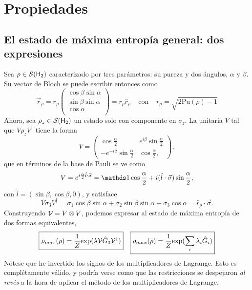 \section{Propiedades}


\subsection{El estado de máxima entropía general: dos expresiones}
Sea $\rho\in\mathcal{S}({\sf H}_{2})$ caracterizado por tres parámetros: su pureza y dos ángulos, $\alpha$ y $\beta$. Su vector de Bloch se puede escribir entonces como
\begin{equation}
  \vec{r}_{\rho}=r_{\rho}\begin{pmatrix}
    \cos{\beta}\sin{\alpha}\\
    \sin{\beta}\sin{\alpha}\\
    \cos{\alpha}\\
  \end{pmatrix}=r_{\rho}\hat{r}_{\rho} \; \; \; \; \text{con} \; \; \; \; r_{\rho}=\sqrt{2\text{Pu}(\rho)-1}
\end{equation}
Ahora, sea $\rho_{z}\in\mathcal{S}({\sf H}_{2})$ un estado solo con componente en $\sigma_{z}$. La unitaria $V$ tal que $V\rho_{z} V^{\dag}$ tiene la forma
\begin{equation}
  V=
  \begin{pmatrix}
      \cos{\frac{\alpha}{2}} & e^{i\beta}\sin{\frac{\alpha}{2}}\\
      -e^{-i\beta}\sin{\frac{\alpha}{2}}& \cos{\frac{\alpha}{2}},
  \end{pmatrix},
\end{equation}
que en términos de la base de Pauli se ve como
\begin{equation}
  V=e^{i\frac{\alpha}{2} \hat{l}\cdot \vec{\sigma}}=\Id \cos{\frac{\alpha}{2}}+i(\hat{l}\cdot \vec{\sigma})\sin{\frac{\alpha}{2}},
\end{equation}
con $\hat{l}=(\sin{\beta},\cos{\beta},0)$, y satisface
\begin{equation}\label{eq:VsigmazV}
  V\sigma_{3}V^{\dag}=\sigma_{1}\cos{\beta}\sin{\alpha}+\sigma_{2}\sin{\beta}\sin{\alpha}+\sigma_{3}\cos{\alpha}=\hat{r}_{\rho}\cdot\vec{\sigma}.
\end{equation}
Construyendo $\mathcal{V}=V\otimes V$, podemos expresar al estado de máxima entropía de dos formas equivalentes,
\begin{align}\label{eq:MaxEntTwoExpr}
  \boxed{\varrho_{max}(\rho)=\frac{1}{Z}\text{exp}(\lambda\mathcal{V}\hat{G}_{3}\mathcal{V}^{\dag})} && \boxed{\varrho_{max}(\rho)=\frac{1}{Z}\text{exp}(\sum_{i}\lambda_{i}\hat{G}_{i})}
\end{align}
Nótese que he invertido los signos de los multiplicadores de Lagrange. Esto es complétamente válido, y podría verse como que las restricciones se despejaron \textit{al revés} a la hora de aplicar el método de los multiplicadores de Lagrange.

